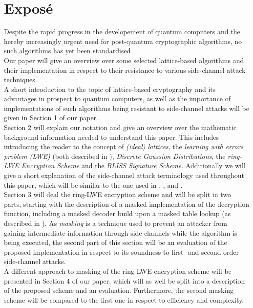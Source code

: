 %
%

\chapter{Expos\'{e}}
Despite the rapid progress in the developement of quantum computers and the hereby increasingly urgent need for post-quantum cryptographic algorithms, no such algorithms has yet been standardised \cite{Nist}.\\
Our paper will give an overview over some selected lattice-based algorithms and their implementation in respect to their resistance to various side-channel attack techniques.\\
A short introduction to the topic of lattice-based cryptography and its advantages in prospect to quantum computers, %
as well as the importance of implementations of such algorithms being resistant to side-channel attacks will be given in Section 1 of our paper.\\ 
Section 2 will explain our notation and give an overview over the mathematic background information needed to understand this paper. This includes introducing the reader to the concept of \textit{(ideal) lattices}, the \textit{learning with errors problem (LWE)} (both described in \cite{cryptoeprint:2012:230}), \textit{Discrete Gaussion Distributions}, the \textit{ring-LWE Encryption Scheme} and the \textit{BLISS Signature Scheme}. Additionally we will give a short explanation of the side-channel attack terminology used throughout this paper, which will be similar to the one used in \cite{DBLP:conf/crypto/KocherJJ99}, \cite{Kocher2011}, \cite{cryptoeprint:2010:646} and \cite{cryptoeprint:2010:385}.\\ 
Section 3 will deal the ring-LWE encryption scheme and will be split in two parts, starting with the description of a masked implementation of the decryption function, including a masked decoder build upon a masked table lookup (as described in \cite{maskedRing}). As \textit{masking} is a technique used to prevent an attacker from gaining intermediate information through side-channels while the algorithm is being executed, the second part of this section will be an evaluation of the proposed implementation in respect to its soundness to first- and second-order side-channel attacks.\\ 
A different approach to masking of the ring-LWE encryption scheme \cite{Reparaz2016} will be presented in Section 4 of our paper, which will as well be split into a description of the proposed scheme and an evaluation. Furthermore, the second masking scheme will be compared to the first one in respect to efficiency and complexity.\\
